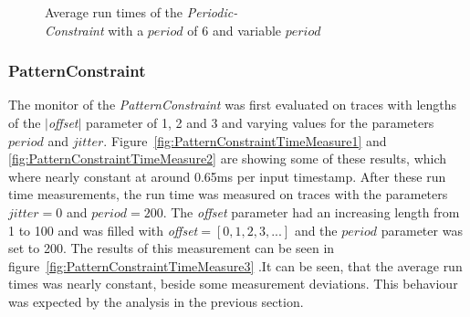 \begin{figure}
\begin{minipage}{0.45\textwidth}
		\centering
		\caption{Average run times of the \textit{Periodic-\\Constraint} with a $period$ of 6 and variable $period$}
		\label{fig:PeriodicConstrainttRunTime2}
	\end{minipage}
\end{figure}



\subsubsection{PatternConstraint}
	The monitor of the \emph{PatternConstraint} was first evaluated on traces with lengths of the $|$\textit{offset}$|$ parameter of 1, 2 and 3 and varying values for the parameters $period$ and $jitter$. Figure~\ref{fig:PatternConstraintTimeMeasure1} and \ref{fig:PatternConstraintTimeMeasure2} are showing some of these results, which where nearly constant at around 0.65ms per input timestamp. After these run time measurements, the run time was measured on traces with the parameters $jitter=0$ and $period=200$. The \textit{offset} parameter had an increasing length from 1 to 100 and was filled with \textit{offset}$=[0, 1, 2, 3, ...]$ and the $period$ parameter was set to 200. The results of this measurement can be seen in figure~\ref{fig:PatternConstraintTimeMeasure3} .It can be seen, that the average run times was nearly constant, beside some measurement deviations. This behaviour was expected by the analysis in the previous section.
	
